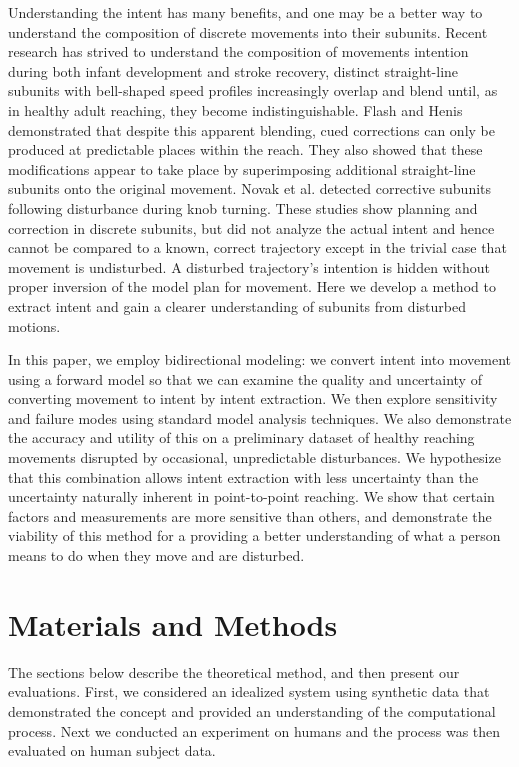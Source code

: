 \documentclass[10pt]{article}
\begin{document}
Understanding the intent has many benefits, and one may be a better way to understand the composition of discrete movements into their subunits. Recent research has strived to understand the composition of movements intention during both infant development\cite{von1979observations} and stroke recovery\cite{rohrer2004submovements}, distinct straight-line subunits with bell-shaped speed profiles increasingly overlap and blend until, as in healthy adult reaching\cite{woodworth1899accuracy}, they become indistinguishable. Flash and Henis \cite{flash1991arm} demonstrated that despite this apparent blending, cued corrections can only be produced at predictable places within the reach. They also showed that these modifications appear to take place by superimposing additional straight-line subunits onto the original movement. Novak et al. \cite{novak2002use} detected corrective subunits following disturbance during knob turning. These studies show planning and correction in discrete subunits, but did not analyze the actual intent and hence cannot be compared to a known, correct trajectory except in the trivial case that movement is undisturbed. A disturbed trajectory's intention is hidden without proper inversion of the model plan for movement. Here we develop a method to extract intent and gain a clearer understanding of subunits from disturbed motions.

In this paper, we employ bidirectional modeling: we convert intent into movement using a forward model so that we can examine the quality and uncertainty of converting movement to intent by intent extraction. We then explore sensitivity and failure modes using standard model analysis techniques. We also demonstrate the accuracy and utility of this on a preliminary dataset of healthy reaching movements disrupted by occasional, unpredictable disturbances. We hypothesize that this combination allows intent extraction with less uncertainty than the uncertainty naturally inherent in point-to-point reaching. We show that certain factors and measurements are more sensitive than others, and demonstrate the viability of this method for a providing a better understanding of what a person means to do when they move and are disturbed.


\section*{Materials and Methods}
The sections below describe the theoretical method, and then present our evaluations. First, we considered an idealized system using synthetic data that demonstrated the concept and provided an understanding of the computational process. Next we conducted an experiment on humans and the process was then evaluated on human subject data. 
\end{document}
